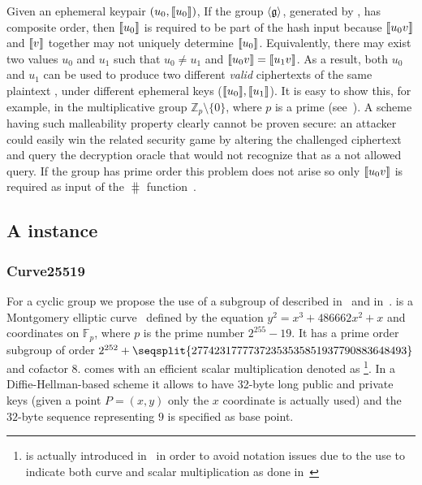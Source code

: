 Given an ephemeral keypair $(u_0, \llbracket {u_0} \rrbracket)$, If the group $\langle \mathfrak{g} \rangle$, generated by \groupSetup{}, has composite order, then $\llbracket {u_0} \rrbracket$ is required to be part of the hash input because $\llbracket {u_0 v} \rrbracket$ and $\llbracket {v} \rrbracket$ together may not uniquely determine $\llbracket {u_0} \rrbracket$. Equivalently, there may exist two values $u_0$ and $u_1$ such that $u_0 \neq u_1$ and $\llbracket {u_0 v} \rrbracket = \llbracket {u_1 v} \rrbracket$. As a result, both $u_0$ and $u_1$ can be used to produce two different \emph{valid} ciphertexts of the same plaintext \msg, under different ephemeral keys ($\llbracket {u_0} \rrbracket, \llbracket {u_1} \rrbracket$). It is easy to show this, for example, in the multiplicative group $\mathbb{Z}_p \setminus \{0\}$, where $p$ is a prime (see~\cite[Section 3.1]{abdalla1999dhaes}). A scheme having such malleability property clearly cannot be proven \indccaii{} secure: an attacker could easily win the related security game by altering the challenged ciphertext and query the decryption oracle that would not recognize that as a not allowed query. If the group has prime order this problem does not arise so only $\llbracket {u_0v} \rrbracket$ is required as input of the $\hash$ function~\cite[Section 3]{abdalla2001dhies}.

\subsection{A \dhaes{} instance}\label{instantiation:enc:algos}

\subsubsection{Curve25519}\label{instantiation:enc:algos:curve25519}

For a cyclic group we propose the use of a subgroup of  described in~\cite{bernstein2006curve25519} and in~\cite{rfc7748}.  is a Montgomery elliptic curve~\cite{montgomery1987speeding} defined by the equation $y^2 = x^3 + 486662x^2 + x$ and coordinates on $\mathbb{F}_p$, where $p$ is the prime number $2^{255}-19$. It has a prime order subgroup of order $2^{252} + \seqsplit{27742317777372353535851937790883648493}$ and cofactor $8$.
 comes with an efficient scalar multiplication denoted as \footnote{ is actually introduced in~\cite{rfc7748} in order to avoid notation issues due to the use  to indicate both curve and scalar multiplication as done in~\cite{bernstein2006curve25519}}. In a Diffie-Hellman-based scheme it allows to have 32-byte long public and private keys (given a point $P = (x,y)$ only the $x$ coordinate is actually used) and the $32$-byte sequence representing $9$ is specified as base point.

